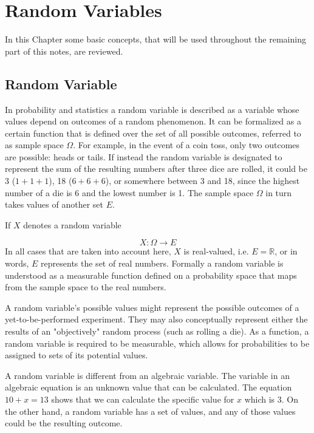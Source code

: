\chapter{Random Variables}\label{fundamentals}

In this Chapter some basic concepts, that will be used throughout the remaining part of this notes, are reviewed.

\section{Random Variable}\label{random-variables}

In probability and statistics a random variable is described as a variable whose values depend on 
outcomes of a random phenomenon. 
It can be formalized as a certain function that is defined over the set of all possible outcomes,
referred to as sample space \(\Omega\). For example, in the event of a coin toss, only two outcomes 
are possible: heads or tails. 
If instead the random variable is designated to represent the sum of the resulting numbers after 
three dice are rolled, it could be 3 ($1 + 1+ 1$), 18 ($6 + 6 + 6$), or somewhere between 3 and 18, 
since the highest number of a die is 6 and the lowest number is 1.
The sample space $\Omega$ in turn takes values of another set \(E\). 

If \(X\) denotes a random variable

\begin{equation}
	X:\Omega \rightarrow E
\end{equation}
In all cases that are taken into account here, \(X\) is real-valued, i.e. \(E=\mathbb {R}\), 
or in words, \(E\) represents the set of real numbers. 
Formally a random variable is understood as a measurable function defined on a probability space 
that maps from the sample space to the real numbers.

A random variable's possible values might represent the possible outcomes of a yet-to-be-performed experiment. 
They may also conceptually represent either the results of an "objectively" random process (such as rolling a die).
As a function, a random variable is required to be measurable, which allows for probabilities 
to be assigned to sets of its potential values. 

A random variable is different from an algebraic variable. The variable in an algebraic equation is an 
unknown value that can be calculated. The equation $10 + x = 13$ shows that we can calculate the specific 
value for $x$ which is 3. On the other hand, a random variable has a set of values, and any of those 
values could be the resulting outcome.

